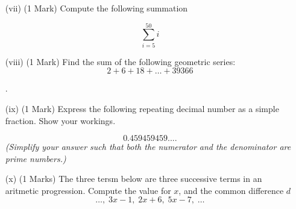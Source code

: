 \documentclass[11pt]{article} %
\begin{document}
\begin{enumerate} %
	\item[(vii)](1 Mark) Compute the following summation
	
	\[ \sum_{i=5}^{50} i \]

	\vspace{5.5cm}
	\item[(viii)] (1 Mark) Find the sum of the following geometric series: 
		\[2 + 6 + 18 +  \ldots + 39366		\]



\newpage
.
\newpage	
	\item[(ix)] (1 Mark) Express the following repeating decimal number as a simple fraction. Show your workings.
	
	\[0.459459459....\]
\textit{(Simplify your answer such that both the numerator and the denominator are prime numbers.)}
	\vspace{5.5cm}

	\item[(x)] (1 Marks) The three tersm below are three successive terms in an aritmetic progression. Compute the value for $x$, and the common difference $d$
		\[ \ldots,\; 3x-1,\; 2x+6,\;	5x-7,\; \ldots		  \]
		
\end{enumerate}
\end{document}
